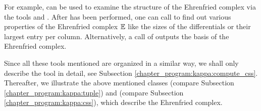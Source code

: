 For example,  can be used to examine the structure of the Ehrenfried complex via the tools
 and .
After  has been performed, one can call 
to find out various properties of the Ehrenfried complex $\mathbb E$
like the sizes of the differentials or their largest entry per column.
Alternatively, a call of  outputs the basis of the Ehrenfried complex.

Since all these tools mentioned are organized in a similar way, 
we shall only describe the tool  in detail, see Subsection \ref{chapter_program:kappa:compute_css}.
Thereafter, we illustrate the above mentioned classes  (compare Subsection \ref{chapter_program:kappa:tuple}) and  (compare Subsection \ref{chapter_program:kappa:css}),
which describe the Ehrenfried complex.




